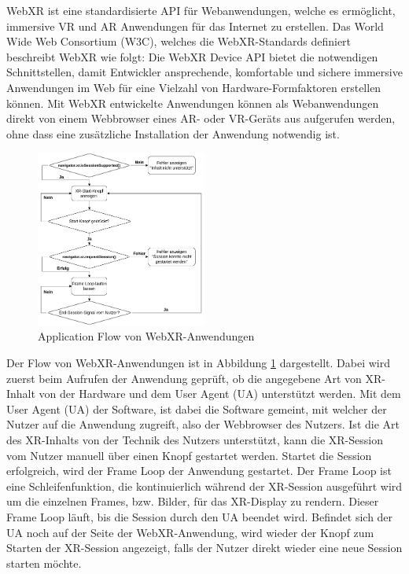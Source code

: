 WebXR ist eine standardisierte API für Webanwendungen, welche es ermöglicht, immersive VR und AR Anwendungen für das Internet zu erstellen.
Das World Wide Web Consortium (W3C), welches die WebXR-Standards definiert beschreibt WebXR wie folgt: \glqq{}Die WebXR Device API bietet die notwendigen Schnittstellen, damit Entwickler ansprechende, komfortable und sichere immersive Anwendungen im Web für eine Vielzahl von Hardware-Formfaktoren erstellen können.\grqq{} \autocite[aus dem Englischen mit DeepL ][1. Introduction]{w3c_webxr}
Mit WebXR entwickelte Anwendungen können als Webanwendungen direkt von einem Webbrowser eines AR- oder VR-Geräts aus aufgerufen werden, ohne dass eine zusätzliche Installation der Anwendung notwendig ist.

\begin{figure}[H]
    \centering
    \includegraphics[width=0.5\textwidth]{images/WebXR-App-Flow.png}
    \caption{Application Flow von WebXR-Anwendungen}
    \label{fig:webxr-app-flow}
  \end{figure}

Der Flow von WebXR-Anwendungen ist in Abbildung \ref{fig:webxr-app-flow} dargestellt.
Dabei wird zuerst beim Aufrufen der Anwendung geprüft, ob die angegebene Art von XR-Inhalt von der Hardware und dem User Agent (UA) unterstützt werden.
Mit dem User Agent (UA) der Software, ist dabei die Software gemeint, mit welcher der Nutzer auf die Anwendung zugreift, also der Webbrowser des Nutzers.
Ist die Art des XR-Inhalts von der Technik des Nutzers unterstützt, kann die XR-Session vom Nutzer manuell über einen Knopf gestartet werden.
Startet die Session erfolgreich, wird der Frame Loop der Anwendung gestartet.
Der Frame Loop ist eine Schleifenfunktion, die kontinuierlich während der XR-Session ausgeführt wird um die einzelnen Frames, bzw. Bilder, für das XR-Display zu rendern.
Dieser Frame Loop läuft, bis die Session durch den UA beendet wird.
Befindet sich der UA noch auf der Seite der WebXR-Anwendung, wird wieder der Knopf zum Starten der XR-Session angezeigt, falls der Nutzer direkt wieder eine neue Session starten möchte.

